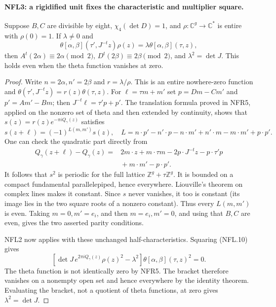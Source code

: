 \paragraph{NFL3: a rigidified unit fixes the characteristic and multiplier square.}
\label{claim:NFL3}
Suppose $B,C$ are divisible by eight, $\chi_4(\det D)=1$, and
$\rho:\mathbb C^g\to\mathbb C^*$ is entire with $\rho(0)=1$.
If $\lambda\ne0$ and
\[
 \theta[\alpha,\beta](\tau',J^{-t}z)\rho(z)
      =\lambda\theta[\alpha,\beta](\tau,z),
 \tag{NFL.10}
\]
then $A^t(2\alpha)\equiv2\alpha\pmod2$,
$D^t(2\beta)\equiv2\beta\pmod2$, and $\lambda^2=\det J$.
This holds even when the theta function vanishes at zero.

\begin{proof}
Write $n=2\alpha,n'=2\beta$ and
$r=\lambda/\rho$.  This is an entire nowhere-zero function and
$\theta(\tau',J^{-t}z)=r(z)\theta(\tau,z)$.
For $\ell=\tau m+m'$ set
$p=Dm-Cm'$ and $p'=Am'-Bm$; then
$J^{-t}\ell=\tau'p+p'$.
The translation formula proved in NFR5, applied on the nonzero
set of theta and then extended by continuity, shows that
$s(z)=r(z)e^{-\pi iQ_\gamma(z)}$ satisfies
\[
 s(z+\ell)=(-1)^{L(m,m')}s(z),\quad
 L=n\cdot p'-n'\cdot p-n\cdot m'+n'\cdot m
          -m\cdot m'+p\cdot p'.
 \tag{NFL.11}
\]
One can check the quadratic part directly from
\[
 \begin{split}
 Q_\gamma(z+\ell)-Q_\gamma(z)
   ={}&2m\cdot z+m\cdot\tau m
       -2p\cdot J^{-t}z-p\cdot\tau'p\\
     &{}+m\cdot m'-p\cdot p'.
 \end{split}
\]
It follows that $s^2$ is periodic for the full lattice
$\mathbb Z^g+\tau\mathbb Z^g$.  It is bounded on a compact
fundamental parallelepiped, hence everywhere.  Liouville's theorem
on complex lines makes it constant.  Since $s$ never vanishes,
it too is constant (its image lies in the two square roots of a
nonzero constant).  Thus every $L(m,m')$ is even.
Taking $m=0,m'=e_i$, and then $m=e_i,m'=0$, and using that
$B,C$ are even, gives the two asserted parity conditions.

NFL2 now applies with these unchanged half-characteristics.
Squaring (NFL.10) gives
\[
 [\det J\,e^{2\pi iQ_\gamma(z)}\rho(z)^2-\lambda^2]
       \theta[\alpha,\beta](\tau,z)^2=0.
\]
The theta function is not identically zero by NFR5.  The bracket
therefore vanishes on a nonempty open set and hence everywhere
by the identity theorem.  Evaluating the bracket, not a quotient
of theta functions, at zero gives $\lambda^2=\det J$.
\end{proof}

